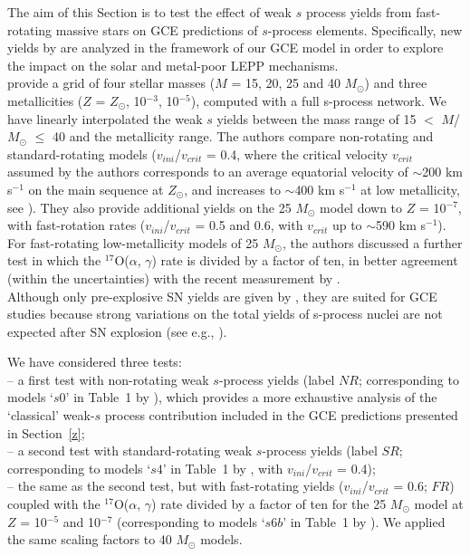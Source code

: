 \documentclass[manuscript]{aastex}
\begin{document}
The aim of this Section is to test the effect of weak $s$ process yields from 
fast-rotating massive stars on GCE predictions of $s$-process
elements. Specifically, new yields by
\citet{fris16} are analyzed in the framework of our GCE model in order to explore
the impact on the solar and metal-poor LEPP mechanisms.
\\
\citet{fris16} provide a grid of 
four stellar masses ($M$ = 15, 20, 25 and 40 $M_\odot$) and three metallicities 
($Z$ = $Z_\odot$, 10$^{-3}$, 10$^{-5}$), computed with a full s-process network. 
We have linearly interpolated the weak $s$ yields between the mass
range of 15 $<$ $M$/$M_\odot$ $\leq$ 40 and the metallicity range.
The authors compare non-rotating and standard-rotating models ($v_{ini}$/$v_{crit}$ 
= 0.4, where the critical velocity $v_{crit}$ assumed by the authors corresponds to an
average equatorial velocity of $\sim$200 km s$^{-1}$ on the main sequence at 
$Z_\odot$, and increases to $\sim$400 km s$^{-1}$ at low metallicity, see \citealt{fris12}).
They also provide additional yields on the 25 $M_\odot$ model down to $Z$ = 
10$^{-7}$, with fast-rotation rates ($v_{ini}$/$v_{crit}$ = 0.5 and 0.6, with 
$v_{crit}$ up to $\sim$590 km s$^{-1}$).
For fast-rotating low-metallicity models of 25 $M_\odot$, the authors discussed a further
test in which the $^{17}$O($\alpha$, $\gamma$) rate is divided by 
a factor of ten, in better agreement (within the uncertainties) with the recent
measurement by \citet{best13}.
\\
Although only pre-explosive SN yields are given by \citet{fris16}, they are suited for 
GCE studies because strong variations on the total yields of s-process nuclei are not 
expected after SN explosion (see e.g., \citealt{tur09}). 




We have considered three tests: \\
-- a first test with non-rotating weak $s$-process yields (label $NR$; corresponding to models 
`$s0$' in Table~1 by \citealt{fris16}), which provides a more exhaustive
analysis of the `classical' weak-$s$ process contribution included in the GCE predictions 
presented in Section~\ref{z};\\
-- a second test with standard-rotating weak $s$-process yields (label $SR$; corresponding to models 
`$s4$' in Table~1 by \citealt{fris16}, with $v_{ini}$/$v_{crit}$ = 0.4); \\
-- the same as the second test, but with fast-rotating yields ($v_{ini}$/$v_{crit}$ = 0.6; $FR$) 
coupled with the $^{17}$O($\alpha$, $\gamma$) rate divided by a factor of ten for the 25 $M_\odot$ 
model at $Z$ = 10$^{-5}$ and 10$^{-7}$ (corresponding to models `$s6b$' in Table~1 by \citealt{fris16}). 
We applied the same scaling factors to 40 $M_\odot$ models.
\end{document}
